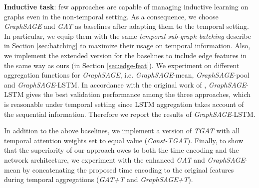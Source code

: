 \documentclass{article} %
\begin{document}
\textbf{Inductive task}: few approaches are capable of managing inductive learning on graphs even in the non-temporal setting. As a consequence, we choose \textsl{GraphSAGE} and \textsl{GAT} as baselines after adapting them to the temporal setting. In particular, we equip them with the same \emph{temporal sub-graph batching} describe in Section \ref{sec:batching} to maximize their usage on temporal information. Also, we implement the extended version for the baselines to include edge features in the same way as ours (in Section \ref{sec:edge-feat}). We experiment on different aggregation functions for \textsl{GraphSAGE}, i.e. \textsl{GraphSAGE}-mean, \textsl{GraphSAGE}-pool and \textsl{GraphSAGE}-LSTM. 
In accordance with the original work of \cite{hamilton2017inductive}, \textsl{GraphSAGE}-LSTM gives the best validation performance among the three approaches, which is reasonable under temporal setting since LSTM aggregation takes account of the sequential information. Therefore we report the results of \textsl{GraphSAGE}-LSTM.

In addition to the above baselines, we implement a version of \textsl{TGAT} with all temporal attention weights set to equal value (\textsl{Const-TGAT}). Finally, to show that the superiority of our approach owes to both the time encoding and the network architecture, we experiment with the enhanced \textsl{GAT} and \textsl{GraphSAGE}-mean by concatenating the proposed time encoding to the original features during temporal aggregations (\textsl{GAT+T} and \textsl{GraphSAGE+T}).
\end{document}
